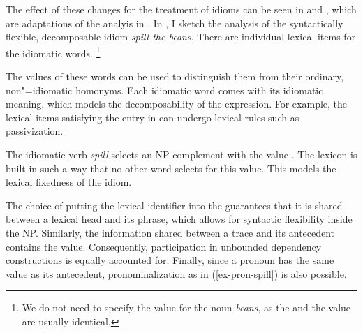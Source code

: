 \documentclass[output=paper,biblatex,babelshorthands,newtxmath,draftmode,colorlinks,citecolor=brown]{langscibook}
\begin{document}
The effect of these changes for the treatment of idioms can be seen in  and
, which are adaptations of the analyis in . In , I sketch the analysis of the syntactically flexible, decomposable idiom \emph{spill the beans}.  There are individual lexical items for the idiomatic words.%
\footnote{We do not need to specify the  value for the noun \emph{beans}, as the  and the  value are usually identical.}

\eal %
\label{ke-spill}
\ex 
\label{le-idiomatic-spill}
\ex 
{}
\zl 

\noindent
The  values of these words can be used to distinguish them from their ordinary,
non"=idiomatic homonyms.  Each idiomatic word comes with its idiomatic meaning, which models the
decomposability of the expression.  For example, the lexical items satisfying the entry in
 can undergo lexical rules such as passivization.

\largerpage[1]
The idiomatic verb \emph{spill} selects an NP complement with the  value
.  The lexicon is built in such a way that no other word selects for this
 value.  This models the lexical fixedness of the idiom.

The choice of putting the lexical identifier into the  guarantees that it is shared
between a lexical head and its phrase, which allows for syntactic flexibility inside the NP.
Similarly, the information shared between a trace and its antecedent contains the 
value. Consequently, participation in unbounded dependency constructions is equally accounted for.
Finally, since a pronoun has the same  value as its antecedent, pronominalization as in
(\ref{ex-pron-spill}) is also possible.
\end{document}
